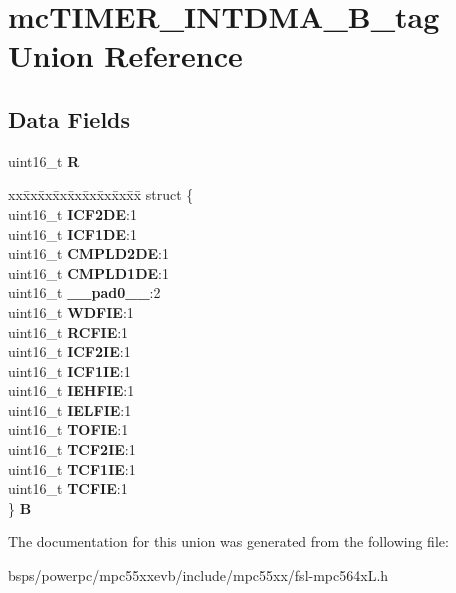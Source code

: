 \hypertarget{unionmcTIMER__INTDMA__16B__tag}{}\section{mc\+T\+I\+M\+E\+R\+\_\+\+I\+N\+T\+D\+M\+A\+\_\+B\+\_\+tag Union Reference}
\label{unionmcTIMER__INTDMA__16B__tag}
\subsection*{Data Fields}
\begin{DoxyCompactItemize}
\item 
\mbox{\label{unionmcTIMER__INTDMA__16B__tag_ac23bde2d1daea03c4d08c68b8e2a5840}} 
uint16\+\_\+t {\bfseries R}
\item 
\mbox{\label{unionmcTIMER__INTDMA__16B__tag_a9c544a15e6dce913f473bfb44db8a348}} 
\begin{tabbing}
xx\=xx\=xx\=xx\=xx\=xx\=xx\=xx\=xx\=\kill
struct \{\\
\>uint16\_t {\bfseries ICF2DE}:1\\
\>uint16\_t {\bfseries ICF1DE}:1\\
\>uint16\_t {\bfseries CMPLD2DE}:1\\
\>uint16\_t {\bfseries CMPLD1DE}:1\\
\>uint16\_t {\bfseries \_\_pad0\_\_}:2\\
\>uint16\_t {\bfseries WDFIE}:1\\
\>uint16\_t {\bfseries RCFIE}:1\\
\>uint16\_t {\bfseries ICF2IE}:1\\
\>uint16\_t {\bfseries ICF1IE}:1\\
\>uint16\_t {\bfseries IEHFIE}:1\\
\>uint16\_t {\bfseries IELFIE}:1\\
\>uint16\_t {\bfseries TOFIE}:1\\
\>uint16\_t {\bfseries TCF2IE}:1\\
\>uint16\_t {\bfseries TCF1IE}:1\\
\>uint16\_t {\bfseries TCFIE}:1\\
\} {\bfseries B}\\

\end{tabbing}\end{DoxyCompactItemize}


The documentation for this union was generated from the following file\+:\begin{DoxyCompactItemize}
\item 
bsps/powerpc/mpc55xxevb/include/mpc55xx/fsl-\/mpc564x\+L.\+h\end{DoxyCompactItemize}
